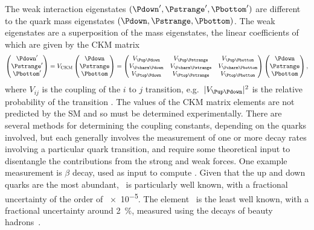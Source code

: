 The weak interaction eigenstates $(\Pdown', \Pstrange', \Pbottom')$ are 
different to the quark mass eigenstates $(\Pdown, \Pstrange, \Pbottom)$.
The weak eigenstates are a superposition of the mass eigenstates, the linear 
coefficients of which are given by the \ac{CKM} matrix
\begin{equation}
  \begin{pmatrix} \Pdown' \\ \Pstrange' \\ \Pbottom' \end{pmatrix}
  =
  V_{\text{CKM}}\begin{pmatrix} \Pdown \\ \Pstrange \\ \Pbottom \end{pmatrix}
  =
  \begin{pmatrix}
    \Vud & \Vus & \Vub \\
    \Vcd & \Vcs & \Vcb \\
    \Vtd & \Vts & \Vtb
  \end{pmatrix}
  \begin{pmatrix} \Pdown \\ \Pstrange \\ \Pbottom \end{pmatrix},
\end{equation}
where $V_{ij}$ is the coupling of the $i$ to $j$ transition, e.g.\ $|\Vud|^{2}$ 
is the relative probability of the transition \decay{\Pdown}{\Pup}.
The values of the \ac{CKM} matrix elements are not predicted by the \ac{SM} and 
so must be determined experimentally.
There are several methods for determining the coupling constants, depending on 
the quarks involved, but each generally involves the measurement of one or more 
decay rates involving a particular quark transition, and require some 
theoretical input to disentangle the contributions from the strong and weak 
forces.
One example measurement is $\beta$ decay, used as input to compute \Vud.
Given that the up and down quarks are the most abundant, \Vud\ is particularly 
well known, with a fractional uncertainty of the order of \num{e-5}.
The element \Vub\ is the least well known, with a fractional uncertainty around 
\SI{2}{\percent}, measured using the decays of beauty 
hadrons~\cite{Charles:2004jd}.

